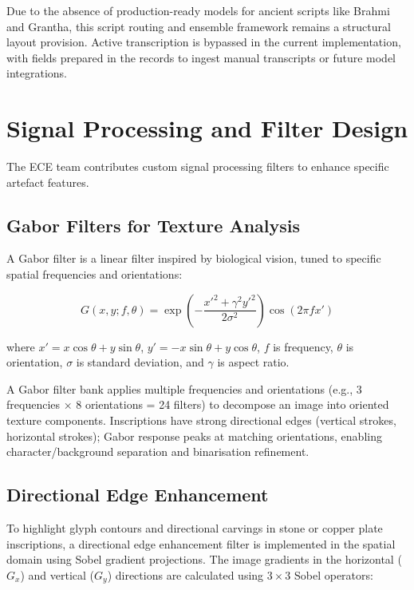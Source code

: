 Due to the absence of production-ready models for ancient scripts like Brahmi and Grantha, this script routing and ensemble framework remains a structural layout provision. Active transcription is bypassed in the current implementation, with fields prepared in the records to ingest manual transcripts or future model integrations.

\section{Signal Processing and Filter Design}

The ECE team contributes custom signal processing filters to enhance specific artefact features.

\subsection{Gabor Filters for Texture Analysis}

A Gabor filter is a linear filter inspired by biological vision, tuned to specific spatial frequencies and orientations:

\begin{equation}
G(x, y; f, \theta) = \exp\left( -\frac{x'^2 + \gamma^2 y'^2}{2\sigma^2} \right) \cos(2\pi f x')
\end{equation}

where $x' = x \cos\theta + y \sin\theta$, $y' = -x \sin\theta + y \cos\theta$, $f$ is frequency, $\theta$ is orientation, $\sigma$ is standard deviation, and $\gamma$ is aspect ratio.

A Gabor filter bank applies multiple frequencies and orientations (e.g., 3 frequencies × 8 orientations = 24 filters) to decompose an image into oriented texture components. Inscriptions have strong directional edges (vertical strokes, horizontal strokes); Gabor response peaks at matching orientations, enabling character/background separation and binarisation refinement.

\subsection{Directional Edge Enhancement}

To highlight glyph contours and directional carvings in stone or copper plate inscriptions, a directional edge enhancement filter is implemented in the spatial domain using Sobel gradient projections. The image gradients in the horizontal ($G_x$) and vertical ($G_y$) directions are calculated using $3\times3$ Sobel operators:

